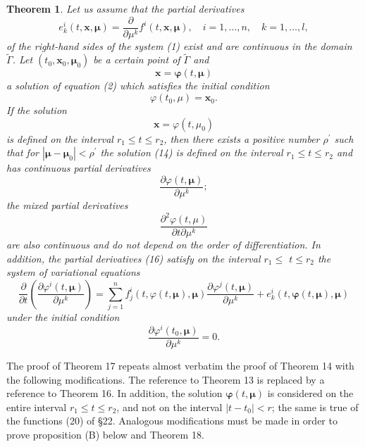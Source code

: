 \documentclass[10pt,a5paper]{book}
\makeatletter
\theoremstyle{plain}
\newtheorem{theorem}{Theorem}
\theoremstyle{definition}
\theoremstyle{remark}
\renewenvironment{proof}[1][\proofname]{\par
  \pushQED{\qed}%
  \normalfont\topsep6\p@\@plus6\p@\relax
  \trivlist
  \item\relax{\itshape #1\@addpunct{.}}\hspace\labelsep\ignorespaces
}{\popQED\endtrivlist\@endpefalse}
\makeatother
\begin{document}
\begin{theorem}
Let us assume that the partial derivatives
\[
e_{k}^{i}(t, \mathbf{x}, \boldsymbol{\mu})=\frac{\partial}{\partial \mu^{k}} f^{i}(t, \mathbf{x}, \boldsymbol{\mu}), \quad i=1, \ldots, n, \quad k=1, \ldots, l,
\]
of the right-hand sides of the system (1) exist and are continuous in the domain $\widetilde{\Gamma}$. Let $\left(t_{0}, \mathbf{x}_{0}, \boldsymbol{\mu}_{0}\right)$ be a certain point of $\widetilde{\Gamma}$ and
\begin{equation*}
\mathbf{x}=\boldsymbol{\varphi}(t, \boldsymbol{\mu}) \tag{14}
\end{equation*}
a solution of equation (2) which satisfies the initial condition
\begin{equation*}
\varphi\left(t_{0}, \mu\right)=\mathbf{x}_{0} . \tag{15}
\end{equation*}
If the solution
\[
\mathbf{x}=\varphi\left(t, \mu_{0}\right)
\]
is defined on the interval $r_{1} \leq t \leq r_{2}$, then there exists a positive number $\rho^{\prime}$ such that for $\left|\boldsymbol{\mu}-\boldsymbol{\mu}_{0}\right|<\rho^{\prime}$ the solution (14) is defined on the interval $r_{1} \leq t \leq r_{2}$ and has continuous partial derivatives
\begin{equation*}
\frac{\partial \varphi(t, \boldsymbol{\mu})}{\partial \mu^{k}} ; \tag{16}
\end{equation*}
the mixed partial derivatives
\[
\frac{\partial^{2} \varphi(t, \mu)}{\partial t \partial \mu^{k}}
\]
are also continuous and do not depend on the order of differentiation. In addition, the partial derivatives (16) satisfy on the interval $r_{1} \leq$ $t \leq r_{2}$ the system of variational equations
\[
\frac{\partial}{\partial t}\left(\frac{\partial \varphi^{i}(t, \boldsymbol{\mu})}{\partial \mu^{k}}\right)=\sum_{j=1}^{n} f_{j}^{i}(t, \varphi(t, \boldsymbol{\mu}), \boldsymbol{\mu}) \frac{\partial \varphi^{j}(t, \boldsymbol{\mu})}{\partial \mu^{k}}+e_{k}^{i}(t, \boldsymbol{\varphi}(t, \boldsymbol{\mu}), \boldsymbol{\mu})
\]
under the initial condition
\[
\frac{\partial \varphi^{i}\left(t_{0}, \boldsymbol{\mu}\right)}{\partial \mu^{k}}=0 .
\]
\end{theorem}

\begin{proof}
The proof of Theorem 17 repeats almost verbatim the proof of Theorem 14 with the following modifications. The reference to Theorem 13 is replaced by a reference to Theorem 16. In addition, the solution $\boldsymbol{\varphi}(t, \boldsymbol{\mu})$
is considered on the entire interval $r_{1} \leq t \leq r_{2}$, and not on the interval $\left|t-t_{0}\right|<r$; the same is true of the functions (20) of §22. Analogous modifications must be made in order to prove proposition (B) below and Theorem 18.
\end{proof}
\end{document}
